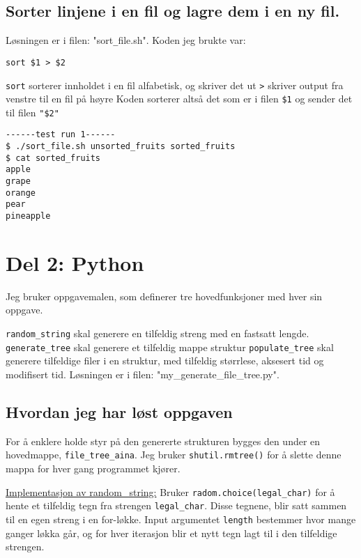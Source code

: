 \documentclass{article}
\begin{document}
\subsection{Sorter linjene i en fil og lagre dem i en ny fil.}
Løsningen er i filen: "sort\verb;_;file.sh". 
Koden jeg brukte var:\par 
\verb;sort $1 > $2;\par
\verb;sort; sorterer innholdet i en fil alfabetisk, og skriver det ut\newline
\verb;>; skriver output fra venstre til en fil på høyre\newline
Koden sorterer altså det som er i filen \verb;$1; og sender det til filen \verb;"$2";
\begin{verbatim} 
------test run 1------
$ ./sort_file.sh unsorted_fruits sorted_fruits
$ cat sorted_fruits 
apple
grape
orange
pear
pineapple
\end{verbatim}

\section{Del 2: Python}
Jeg bruker oppgavemalen, som definerer tre hovedfunksjoner med hver sin oppgave.\par
\verb;random_string; skal generere en tilfeldig streng med en fastsatt lengde. \newline
\verb;generate_tree; skal generere et tilfeldig mappe struktur\newline
\verb;populate_tree; skal generere tilfeldige filer i en struktur, med tilfeldig størrlese, aksesert tid og modifisert tid.\newline
Løsningen er i filen: "my\_generate\_file\_tree.py". 
\subsection{Hvordan jeg har løst oppgaven}
For å enklere holde styr på den genererte strukturen bygges den under en hovedmappe, \verb;file_tree_aina;.
Jeg bruker \verb;shutil.rmtree(); for å slette denne mappa for hver gang programmet kjører.

\underline{Implementasjon av random\_string:}
Bruker \verb;radom.choice(legal_char); for å hente et tilfeldig tegn fra strengen \verb;legal_char;.
Disse tegnene, blir satt sammen til en egen streng i en for-løkke. Input argumentet \verb;length; bestemmer hvor mange ganger løkka går, og for hver iterasjon blir et nytt tegn lagt til i den tilfeldige strengen. 
\end{document}
